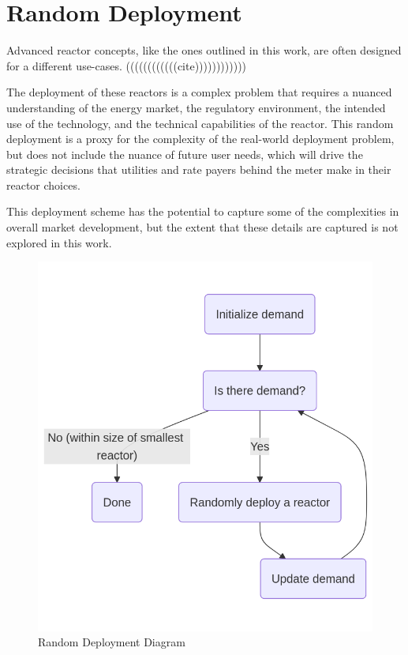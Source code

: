 


\section{Random Deployment}

Advanced reactor concepts, like the ones outlined in this work, are often designed for a different use-cases. ((((((((((((cite))))))))))))


The deployment of these reactors is a complex problem that requires a nuanced
understanding of the energy market, the regulatory environment, the intended
use of the technology, and the technical capabilities of the reactor. This
random deployment is a proxy for the complexity of the real-world deployment
problem, but does not include the nuance of future user needs, which will drive
the strategic decisions that utilities and rate payers behind the meter make in
their reactor choices.

This deployment scheme has the potential to capture some of the complexities in
overall market development, but the extent that these details are captured is
not explored in this work. %

\begin{figure}[!htbp]
    \centering
    \includegraphics[scale=0.4]{images/schemes/random_diagram.png}
    \caption{Random Deployment Diagram}
    \label{fig:random_diagram}
\end{figure}

